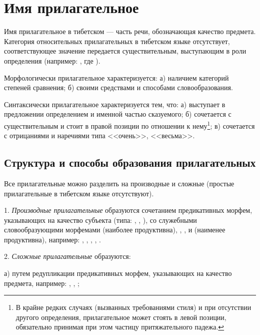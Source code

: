 \section{Имя прилагательное}

Имя прилагательное в тибетском --- часть речи, обозначающая качество предмета. Категория относительных прилагательных в тибетском языке отсутствует, соответствующее значение передается существительным, выступающим в роли определения (например: , где ).

Морфологически прилагательное характеризуется: а) наличием категорий степеней сравнения; б) своими средствами и способами словообразования.

Синтаксически прилагательное характеризуется тем, что:
а) выступает в предложении определением и именной частью сказуемого;
б) сочетается с существительным и стоит в правой позиции по отношении к нему\footnote[27]{В крайне редких случаях (вызванных требованиями стиля) и при отсутствии другого определения, прилагательное может стоять в левой позиции, обязательно принимая при этом частицу притяжательного падежа.};
в) сочетается с отрицаниями и наречиями типа <<очень>>, <<весьма>>.

\subsection{Структура и способы образования прилагательных}

Все прилагательные можно разделить на производные и сложные (простые прилагательные в тибетском языке отсутствуют).

1. \emph{Производные прилагательные} образуются сочетанием предикативных морфем, указывающих на качество субъекта (типа: , , ), со служебными словообразующими морфемами  (наиболее продуктивна), , ,  и  (наименее продуктивна), например:
,
,
,
,
.

2. \emph{Сложные прилагательные} образуются:

а) путем редупликации предикативных морфем, указывающих на качество предмета, например:
,
,
;

